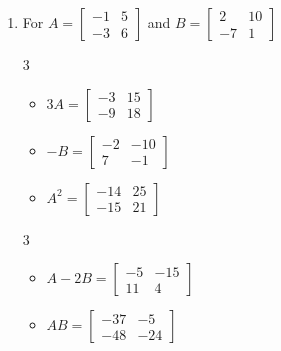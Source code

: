 \documentclass{ximera}
\begin{document}
\begin{enumerate}
\begin{multicols}{3}
\begin{itemize}
\item $BA = \left[ \begin{array}{rr} 8 & -23 \\ 16 & 20 \end{array} \right]$

\end{itemize}
\end{multicols}



\item For  $A = \left[ \begin{array}{rr} -1 & 5 \\ -3 & 6 \end{array} \right]$ and $B=\left[ \begin{array}{rr} 2 & 10 \\ -7 & 1 \end{array} \right]$

\begin{multicols}{3}
\begin{itemize}
\item  $3A = \left[ \begin{array}{rr} -3 & 15 \\ -9 & 18 \end{array} \right]$

\item $-B = \left[ \begin{array}{rr} -2 & -10 \\ 7 & -1 \end{array} \right]$

\item $A^2 = \left[ \begin{array}{rr} -14 & 25 \\ -15 & 21 \end{array} \right]$

\end{itemize}
\end{multicols}


\begin{multicols}{3}
\begin{itemize}
\item  $A-2B = \left[ \begin{array}{rr} -5 & -15 \\ 11 & 4 \end{array} \right]$

\item $AB = \left[ \begin{array}{rr} -37 & -5 \\ -48 & -24 \end{array} \right]$


\end{itemize}
\end{multicols}
\end{enumerate}
\end{document}
